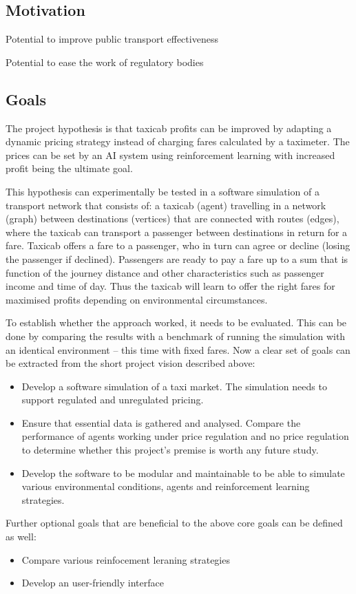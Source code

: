 \subsection{Motivation}

Potential to improve public transport effectiveness

Potential to ease the work of regulatory bodies

\subsection{Goals}

The project hypothesis is that taxicab profits can be improved by adapting a
dynamic pricing strategy instead of charging fares calculated by a taximeter.
The prices can be set by an AI system using reinforcement learning with
increased profit being the ultimate goal. 

This hypothesis can experimentally be tested in a software simulation of a
transport network that consists of: a taxicab (agent) travelling in a network
(graph) between destinations (vertices) that are connected with routes (edges),
where the taxicab can transport a passenger between destinations in return for
a fare. Taxicab offers a fare to a passenger, who in turn can agree or decline
(losing the passenger if declined). Passengers are ready to pay a fare up to a
sum that is function of the journey distance and other  characteristics such as
passenger income and time of day. Thus the taxicab will learn to offer the
right fares for maximised profits depending on environmental circumstances.

To establish whether the approach worked, it needs to be evaluated. This can be
done by comparing the results with a benchmark of running the simulation with an
identical environment -- this time with fixed fares.
Now a clear set of goals can be extracted from the short project vision
described above:

\begin{itemize}
  \item Develop a software simulation of a taxi market. The simulation needs to
        support regulated and unregulated pricing.
  \item Ensure that essential data is gathered and analysed. Compare the 
        performance of agents working under price regulation and no price 
        regulation to determine whether this project's premise is worth any
        future study.
  \item Develop the software to be modular and maintainable to be able to
        simulate various environmental conditions, agents and reinforcement
        learning strategies.
\end{itemize}

Further optional goals that are beneficial to the above core goals can be
defined as well:

\begin{itemize}
  \item Compare various reinfocement leraning strategies
  \item Develop an user-friendly interface
\end{itemize}
